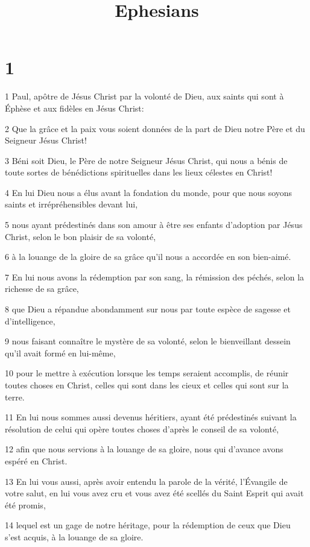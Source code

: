 

\title{Ephesians}


\chapter{1}

\par 1 Paul, apôtre de Jésus Christ par la volonté de Dieu, aux saints qui sont à Éphèse et aux fidèles en Jésus Christ:
\par 2 Que la grâce et la paix vous soient données de la part de Dieu notre Père et du Seigneur Jésus Christ!
\par 3 Béni soit Dieu, le Père de notre Seigneur Jésus Christ, qui nous a bénis de toute sortes de bénédictions spirituelles dans les lieux célestes en Christ!
\par 4 En lui Dieu nous a élus avant la fondation du monde, pour que nous soyons saints et irrépréhensibles devant lui,
\par 5 nous ayant prédestinés dans son amour à être ses enfants d'adoption par Jésus Christ, selon le bon plaisir de sa volonté,
\par 6 à la louange de la gloire de sa grâce qu'il nous a accordée en son bien-aimé.
\par 7 En lui nous avons la rédemption par son sang, la rémission des péchés, selon la richesse de sa grâce,
\par 8 que Dieu a répandue abondamment sur nous par toute espèce de sagesse et d'intelligence,
\par 9 nous faisant connaître le mystère de sa volonté, selon le bienveillant dessein qu'il avait formé en lui-même,
\par 10 pour le mettre à exécution lorsque les temps seraient accomplis, de réunir toutes choses en Christ, celles qui sont dans les cieux et celles qui sont sur la terre.
\par 11 En lui nous sommes aussi devenus héritiers, ayant été prédestinés suivant la résolution de celui qui opère toutes choses d'après le conseil de sa volonté,
\par 12 afin que nous servions à la louange de sa gloire, nous qui d'avance avons espéré en Christ.
\par 13 En lui vous aussi, après avoir entendu la parole de la vérité, l'Évangile de votre salut, en lui vous avez cru et vous avez été scellés du Saint Esprit qui avait été promis,
\par 14 lequel est un gage de notre héritage, pour la rédemption de ceux que Dieu s'est acquis, à la louange de sa gloire.
